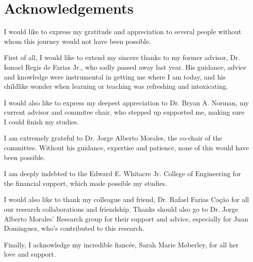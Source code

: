 \documentclass{aux/ttuthes2007}
\begin{document}
\frontmatter


\chapter{\textbf{Acknowledgements}}
I would like to express my gratitude and appreciation to several people without whom this journey would not have been possible.

First of all, I would like to extend my sincere thanks to my former advisor, Dr. Ismael Regis de Farias Jr., who sadly passed away last year. 
His guidance, advice and knowledge were instrumental in getting me where I am today, and his childlike wonder when learning or teaching was refreshing and intoxicating.

I would also like to express my deepest appreciation to Dr. Bryan A. Norman, my current advisor and commitee chair, who stepped up supported me, making sure I could finish my studies.

I am extremely grateful to Dr. Jorge Alberto Morales, the co-chair of the committee. Without his guidance, expertise and patience, none of this would have been possible.

I am deeply indebted to the Edward E. Whitacre Jr. College of Engineering for the financial support, which made possible my studies.

I would also like to thank my colleague and friend, Dr. Rafael Farias Ca\c{c}\~{a}o for all our research collaborations and friendship. Thanks should also go to Dr. Jorge Alberto Morales' Research group for their support and advice, especially for Juan Dominguez, who's contributed to this research.

Finally, I acknowledge my incredible fianc\'{e}e, Sarah Marie Moberley, for all her love and support.



\tableofcontents	%

\end{document}

